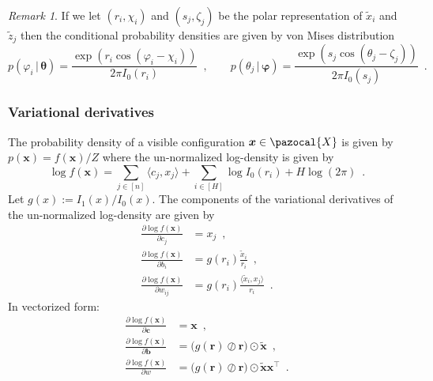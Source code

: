\documentclass[12pt]{article}
\theoremstyle{definition}%
\theoremstyle{definition}
\theoremstyle{remark}
\newtheorem*{remk}{Remark}
\begin{document}
\begin{remk}
If we let $(r_i, \chi_i)$ and $(s_j, \zeta_j)$ be the polar representation of $\tilde{x}_i$ and $\tilde{z}_j$ then the conditional probability densities are given by von Mises distribution
\begin{equation}
	p(\varphi_i \, | \, \bm{\theta}) = \frac{\exp \left(r_i \cos(\varphi_i - \chi_i) \right)}{2\pi I_0(r_i)} \enspace , \quad \quad p(\theta_j \, | \, \bm{\varphi}) = \frac{\exp \left(s_j \cos(\theta_j - \zeta_j) \right)}{2\pi I_0(s_j)} \enspace .
\end{equation}
\end{remk}

\subsubsection{Variational derivatives}
The probability density of a visible configuration $\bm{x} \in \pazocal{X}$ is given by $p(\bm{x}) = f(\bm{x}) / Z$ where the un-normalized log-density is given by
\begin{equation}
	\log f(\bm{x}) = \sum_{j\in[n]} \langle c_j, x_j \rangle + \sum_{i \in[H]} \log I_0(r_i) + H \log(2\pi) \enspace .
\end{equation}
Let $g(x) := I_1(x) / I_0(x)$. The components of the variational derivatives of the un-normalized log-density are given by
\begin{align}
	\frac{\partial \log f(\bm{x})}{\partial c_j}
		& = x_j \enspace , \\
	\frac{\partial\log f(\bm{x})}{\partial b_i}
		& = g(r_i ) \frac{\tilde{x}_i}{r_i} \enspace , \\
	\frac{\partial\log f(\bm{x})}{\partial w_{ij}}
		& = g(r_i ) \frac{\langle \tilde{x}_i, x_j \rangle}{r_i} \enspace .
\end{align}
In vectorized form:
\begin{align}
	\frac{\partial \log f(\bm{x})}{\partial \bm{c}}
		& = \bm{x} \enspace , \\
	\frac{\partial\log f(\bm{x})}{\partial \bm{b}}
		& = \big(g(\bm{r}) \oslash \bm{r} \big) \odot \tilde{\bm{x}} \enspace , \\
	\frac{\partial\log f(\bm{x})}{\partial w}
		& = \big(g(\bm{r}) \oslash \bm{r} \big)  \odot \tilde{\bm{x}} \bm{x}^\top \enspace .
\end{align}
\end{document}
